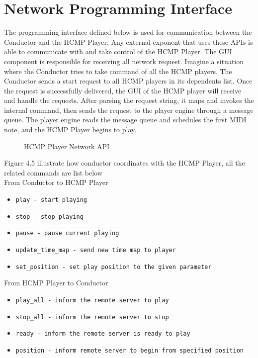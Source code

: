 \section{Network Programming Interface}
The programming interface defined below is used for communication 
between the Conductor and the HCMP Player. Any external exponent that  
uses these APIs is able to communicate with and take control of the 
HCMP Player. The GUI component is responsible for receiving all 
network request. Imagine a situation where the Conductor 
tries to take command of all the HCMP players. The Conductor sends a start
request to all HCMP players in its dependents list.
Once the request is successfully delivered, the GUI of the HCMP player will 
receive and handle the requests. After parsing the request string, 
it maps and invokes the internal command, then sends the request to the player 
engine through a message queue. The player engine reads the message queue and
schedules the first MIDI note, and the HCMP Player begins to play.

\begin{figure}[H]
\caption{HCMP Player Network API \cite{Dawen:2011}}
\end{figure}
Figure 4.5 illustrate how conductor coordinates with the HCMP Player, all the  
related commands are list below \\

From Conductor to HCMP Player
\begin{itemize}
  \item \texttt{play - start playing}  
  \item \texttt{stop - stop playing}
  \item \texttt{pause - pause current playing}
  \item \texttt{update\_time\_map - send new time map to player}  
  \item \texttt{set\_position - set play position to the given parameter}
\end{itemize}

From HCMP Player to Conductor 
\begin{itemize}
  \item \texttt{play\_all - inform the remote server to play}  
  \item \texttt{stop\_all - inform the remote server to stop}  
  \item \texttt{ready - inform the remote server is ready to play}
  \item \texttt{position - inform remote server to begin from specified position}
\end{itemize}
